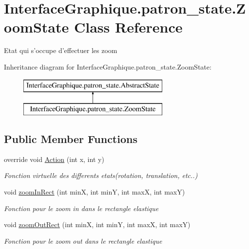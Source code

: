 \hypertarget{class_interface_graphique_1_1patron__state_1_1_zoom_state}{\section{Interface\-Graphique.\-patron\-\_\-state.\-Zoom\-State Class Reference}
\label{class_interface_graphique_1_1patron__state_1_1_zoom_state}
}


Etat qui s'occupe d'effectuer les zoom  


Inheritance diagram for Interface\-Graphique.\-patron\-\_\-state.\-Zoom\-State\-:\begin{figure}[H]
\begin{center}
\leavevmode
\includegraphics[height=2.000000cm]{class_interface_graphique_1_1patron__state_1_1_zoom_state}
\end{center}
\end{figure}
\subsection*{Public Member Functions}
\begin{DoxyCompactItemize}
\item 
override void \hyperlink{class_interface_graphique_1_1patron__state_1_1_zoom_state_aa4608434efc2a14431b08ba9ba071633}{Action} (int x, int y)
\begin{DoxyCompactList}\small\item\em Fonction virtuelle des differents etats(rotation, translation, etc..) \end{DoxyCompactList}\item 
void \hyperlink{class_interface_graphique_1_1patron__state_1_1_zoom_state_af8c68a2ab6017ed82282ab98539e0e2c}{zoom\-In\-Rect} (int min\-X, int min\-Y, int max\-X, int max\-Y)
\begin{DoxyCompactList}\small\item\em Fonction pour le zoom in dans le rectangle elastique \end{DoxyCompactList}\item 
void \hyperlink{class_interface_graphique_1_1patron__state_1_1_zoom_state_a5440f88223701a602cfd54a22f61ee67}{zoom\-Out\-Rect} (int min\-X, int min\-Y, int max\-X, int max\-Y)
\begin{DoxyCompactList}\small\item\em Fonction pour le zoom out dans le rectangle elastique \end{DoxyCompactList}\end{DoxyCompactItemize}


